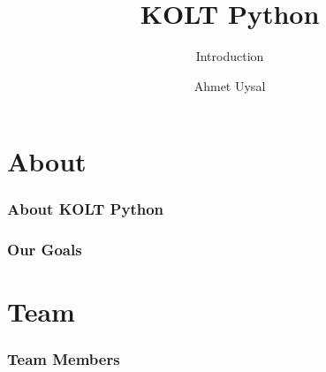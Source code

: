 

\usepackage{../KU-Beamer-Template/style/koc} 

\title{KOLT Python} 
\subtitle{Introduction} 
\date{}
\author{Ahmet Uysal}




  \maketitle


  \section{About}

    \begin{frame}
      \frametitle{About KOLT Python}
    
      
    
    \end{frame}


    \begin{frame}
      \frametitle{Our Goals}
    
      
    
    \end{frame}


  \section{Team}
    \begin{frame}
      \frametitle{Team Members}
    
      
    
    \end{frame}


